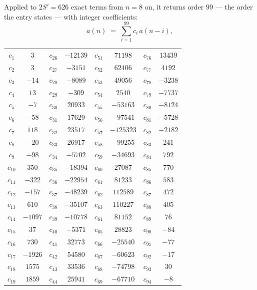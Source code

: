 \documentclass[11pt,a4paper]{article}
\theoremstyle{plain}
\theoremstyle{definition}
\begin{document}
Applied to $2S'=626$ exact terms from $n=8$ on, it returns order $99$ --- the
order the entry states --- with integer coefficients:
\[
a(n)\;=\;\sum_{i=1}^{99}c_i\,a(n-i),
\]
\begin{center}\small
\begin{tabular}{cccccccc}
$c_{1}$ & $3$ & $c_{26}$ & $-12139$ & $c_{51}$ & $71198$ & $c_{76}$ & $13439$ \\
$c_{2}$ & $3$ & $c_{27}$ & $-3151$ & $c_{52}$ & $62406$ & $c_{77}$ & $4192$ \\
$c_{3}$ & $-14$ & $c_{28}$ & $-8089$ & $c_{53}$ & $49056$ & $c_{78}$ & $-3238$ \\
$c_{4}$ & $13$ & $c_{29}$ & $-309$ & $c_{54}$ & $2540$ & $c_{79}$ & $-7737$ \\
$c_{5}$ & $-7$ & $c_{30}$ & $20933$ & $c_{55}$ & $-53163$ & $c_{80}$ & $-8124$ \\
$c_{6}$ & $-58$ & $c_{31}$ & $17629$ & $c_{56}$ & $-97541$ & $c_{81}$ & $-5728$ \\
$c_{7}$ & $118$ & $c_{32}$ & $23517$ & $c_{57}$ & $-125323$ & $c_{82}$ & $-2182$ \\
$c_{8}$ & $-20$ & $c_{33}$ & $26917$ & $c_{58}$ & $-99255$ & $c_{83}$ & $241$ \\
$c_{9}$ & $-98$ & $c_{34}$ & $-5702$ & $c_{59}$ & $-34693$ & $c_{84}$ & $792$ \\
$c_{10}$ & $350$ & $c_{35}$ & $-18394$ & $c_{60}$ & $27087$ & $c_{85}$ & $770$ \\
$c_{11}$ & $-322$ & $c_{36}$ & $-22954$ & $c_{61}$ & $81233$ & $c_{86}$ & $583$ \\
$c_{12}$ & $-157$ & $c_{37}$ & $-48239$ & $c_{62}$ & $112589$ & $c_{87}$ & $472$ \\
$c_{13}$ & $610$ & $c_{38}$ & $-35107$ & $c_{63}$ & $110227$ & $c_{88}$ & $405$ \\
$c_{14}$ & $-1097$ & $c_{39}$ & $-10778$ & $c_{64}$ & $81152$ & $c_{89}$ & $76$ \\
$c_{15}$ & $37$ & $c_{40}$ & $-5371$ & $c_{65}$ & $28823$ & $c_{90}$ & $-84$ \\
$c_{16}$ & $730$ & $c_{41}$ & $32773$ & $c_{66}$ & $-25540$ & $c_{91}$ & $-77$ \\
$c_{17}$ & $-1926$ & $c_{42}$ & $54580$ & $c_{67}$ & $-60623$ & $c_{92}$ & $-17$ \\
$c_{18}$ & $1575$ & $c_{43}$ & $33536$ & $c_{68}$ & $-74798$ & $c_{93}$ & $30$ \\
$c_{19}$ & $1859$ & $c_{44}$ & $25941$ & $c_{69}$ & $-67710$ & $c_{94}$ & $-8$ \\

\end{tabular}
\end{center}
\end{document}
